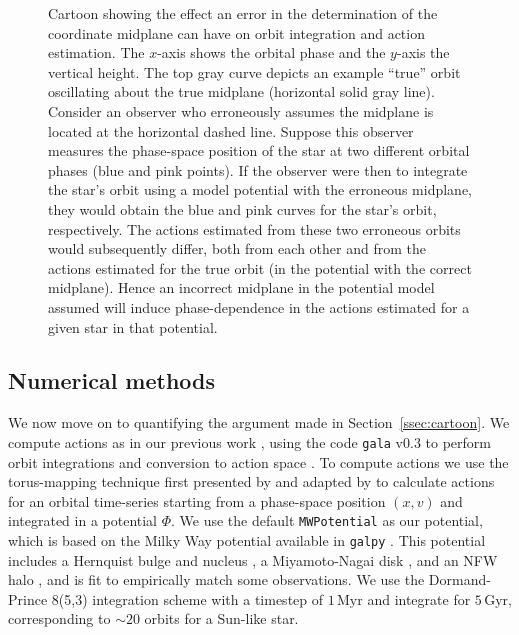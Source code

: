 \documentclass[twocolumn]{aastex62}
\newcommand{\Myr}{\text{Myr}}
\newcommand{\Gyr}{\text{Gyr}}
\begin{document}
\begin{figure}
\caption{Cartoon showing the effect an error in the determination of the
coordinate midplane can have on orbit integration and action estimation. The
$x$-axis shows the orbital phase and the $y$-axis the vertical height. The top
gray curve depicts an example ``true'' orbit oscillating about the true
midplane (horizontal solid gray line). Consider an observer who erroneously
assumes the midplane is located at the horizontal dashed line. Suppose this
observer measures the phase-space position of the star at two different
orbital phases (blue and pink points). If the observer were then to integrate
the star's orbit using a model potential with the erroneous midplane, they
would obtain the blue and pink curves for the star's orbit, respectively. The
actions estimated from these two  erroneous orbits would subsequently differ,
both from each other and from the actions estimated for the true orbit (in the
potential with the correct midplane). Hence an incorrect midplane in the
potential model assumed will induce phase-dependence in the actions estimated
for a given star in that potential.}
\label{fig:cartoon}
\end{figure}

\subsection{Numerical methods} \label{ssec:action_comp}
We now move on to quantifying the argument made in Section~\ref{ssec:cartoon}.
We compute actions as in our previous work \citep{2018ApJ...867...31B}, using
the code \texttt{gala} v0.3 to perform orbit integrations and conversion to
action space \citep{2017JOSS....2..388P,Price-Whelan:2018}. To compute actions
we use the torus-mapping technique first presented by
\citet{1990MNRAS.244..634M} and adapted by \citet{2014MNRAS.441.3284S} to
calculate actions for an orbital time-series starting from a phase-space
position $(x, v)$ and integrated in a potential $\Phi$. We use the default
\texttt{MWPotential} as our potential, which is based on the Milky Way
potential available in \texttt{galpy} \citep{2015ApJS..216...29B}. This
potential includes a Hernquist bulge and nucleus \citep{1990ApJ...356..359H},
a Miyamoto-Nagai disk \citep{1975PASJ...27..533M}, and an NFW halo
\citep{1997ApJ...490..493N}, and is fit to empirically match some
observations. We use the Dormand-Prince 8(5,3) integration scheme
\citep{Dormand80:integrator} with a timestep of $1\,\Myr$ and integrate for
$5\,\Gyr$, corresponding to $\sim 20$ orbits for a Sun-like star.
\end{document}
